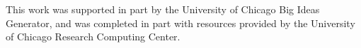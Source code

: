 This work was supported in part by the University of Chicago Big Ideas Generator, and was completed in part with resources provided by the University of Chicago Research Computing Center.
